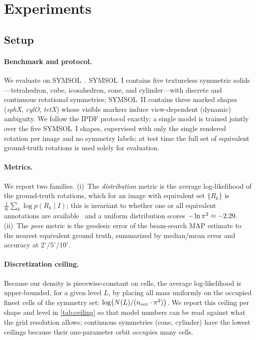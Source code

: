 \section{Experiments}
\label{sec:experiments}

\subsection{Setup}
\label{sec:setup}

\paragraph{Benchmark and protocol.}
We evaluate on SYMSOL~\cite{murphy2021ipdf}. SYMSOL~I contains five textureless
symmetric solids---tetrahedron, cube, icosahedron, cone, and cylinder---with
discrete and continuous rotational symmetries; SYMSOL~II contains three marked
shapes (\textit{sphX}, \textit{cylO}, \textit{tetX}) whose visible markers induce
view-dependent (dynamic) ambiguity. We follow the IPDF protocol exactly: a single
model is trained jointly over the five SYMSOL~I shapes, supervised with only the
single rendered rotation per image and no symmetry labels; at test time the full
set of equivalent ground-truth rotations is used solely for evaluation.

\paragraph{Metrics.}
We report two families. (i)~The \emph{distribution} metric is the average
log-likelihood of the ground-truth rotations, which for an image with equivalent
set $\{R_k\}$ is $\frac{1}{K}\sum_k \log p(R_k \mid I)$; this is invariant to
whether one or all equivalent annotations are available~\cite{murphy2021ipdf} and
a uniform distribution scores $-\ln\pi^2\approx-2.29$. (ii)~The \emph{pose} metric
is the geodesic error of the beam-search MAP estimate to the nearest equivalent
ground truth, summarized by median/mean error and accuracy at $2^\circ/5^\circ/
10^\circ$.

\paragraph{Discretization ceiling.}
Because our density is piecewise-constant on cells, the average log-likelihood is
upper-bounded, for a given level $L$, by placing all mass uniformly on the
occupied finest cells of the symmetry set:
$\log\!\big(N(L)/(n_\text{occ}\cdot\pi^2)\big)$. We report this ceiling per shape
and level in \cref{tab:ceiling} so that model numbers can be read against what the
grid resolution allows; continuous symmetries (cone, cylinder) have the lowest
ceilings because their one-parameter orbit occupies many cells.

